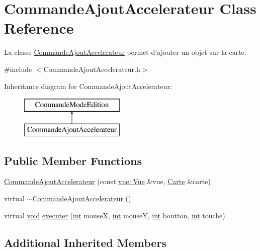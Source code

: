 \hypertarget{class_commande_ajout_accelerateur}{\section{Commande\-Ajout\-Accelerateur Class Reference}
\label{class_commande_ajout_accelerateur}
}


La classe \hyperlink{class_commande_ajout_accelerateur}{Commande\-Ajout\-Accelerateur} permet d'ajouter un objet sur la carte.  




{\ttfamily \#include $<$Commande\-Ajout\-Accelerateur.\-h$>$}

Inheritance diagram for Commande\-Ajout\-Accelerateur\-:\begin{figure}[H]
\begin{center}
\leavevmode
\includegraphics[height=2.000000cm]{class_commande_ajout_accelerateur}
\end{center}
\end{figure}
\subsection*{Public Member Functions}
\begin{DoxyCompactItemize}
\item 
\hyperlink{class_commande_ajout_accelerateur_a5deaad7144cbe48061677b59a8fca95c}{Commande\-Ajout\-Accelerateur} (const \hyperlink{classvue_1_1_vue}{vue\-::\-Vue} \&vue, \hyperlink{class_carte}{Carte} \&carte)
\item 
virtual \hyperlink{class_commande_ajout_accelerateur_ae5ecf61850b7ef9e3a482fc9baaaf3b1}{$\sim$\-Commande\-Ajout\-Accelerateur} ()
\item 
virtual \hyperlink{wglew_8h_aeea6e3dfae3acf232096f57d2d57f084}{void} \hyperlink{class_commande_ajout_accelerateur_a1537ffad37fa05fa20cdbd414890adb3}{executer} (\hyperlink{wglew_8h_a500a82aecba06f4550f6849b8099ca21}{int} mouse\-X, \hyperlink{wglew_8h_a500a82aecba06f4550f6849b8099ca21}{int} mouse\-Y, \hyperlink{wglew_8h_a500a82aecba06f4550f6849b8099ca21}{int} boutton, \hyperlink{wglew_8h_a500a82aecba06f4550f6849b8099ca21}{int} touche)
\end{DoxyCompactItemize}
\subsection*{Additional Inherited Members}


